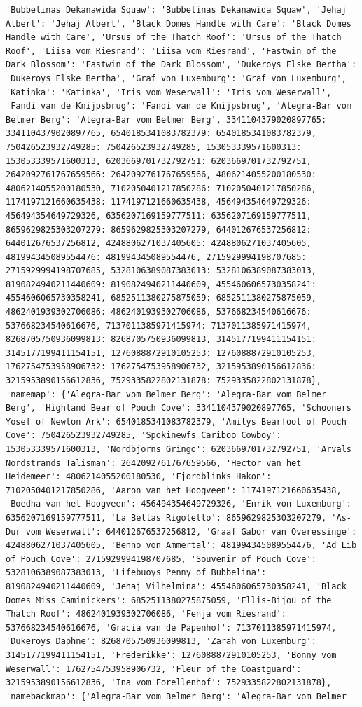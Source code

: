 \documentclass[
  letterpaper,
  DIV=11,
  numbers=noendperiod]{scrreprt}
\begin{document}
\begin{codelisting}
{\begin{verbatim}
'Bubbelinas Dekanawida Squaw': 'Bubbelinas Dekanawida Squaw', 'Jehaj Albert': 'Jehaj Albert', 'Black Domes Handle with Care': 'Black Domes Handle with Care', 'Ursus of the Thatch Roof': 'Ursus of the Thatch Roof', 'Liisa vom Riesrand': 'Liisa vom Riesrand', 'Fastwin of the Dark Blossom': 'Fastwin of the Dark Blossom', 'Dukeroys Elske Bertha': 'Dukeroys Elske Bertha', 'Graf von Luxemburg': 'Graf von Luxemburg', 'Katinka': 'Katinka', 'Iris vom Weserwall': 'Iris vom Weserwall', 'Fandi van de Knijpsbrug': 'Fandi van de Knijpsbrug', 'Alegra-Bar vom Belmer Berg': 'Alegra-Bar vom Belmer Berg', 3341104379020897765: 3341104379020897765, 6540185341083782379: 6540185341083782379, 750426523932749285: 750426523932749285, 153053339571600313: 153053339571600313, 6203669701732792751: 6203669701732792751, 2642092761767659566: 2642092761767659566, 4806214055200180530: 4806214055200180530, 7102050401217850286: 7102050401217850286, 1174197121660635438: 1174197121660635438, 456494354649729326: 456494354649729326, 6356207169159777511: 6356207169159777511, 8659629825303207279: 8659629825303207279, 644012676537256812: 644012676537256812, 4248806271037405605: 4248806271037405605, 481994345089554476: 481994345089554476, 2715929994198707685: 2715929994198707685, 5328106389087383013: 5328106389087383013, 8190824940211440609: 8190824940211440609, 4554606065730358241: 4554606065730358241, 6852511380275875059: 6852511380275875059, 4862401939302706086: 4862401939302706086, 537668234540616676: 537668234540616676, 7137011385971415974: 7137011385971415974, 8268705750936099813: 8268705750936099813, 3145177199411154151: 3145177199411154151, 1276088872910105253: 1276088872910105253, 1762754753958906732: 1762754753958906732, 3215953890156612836: 3215953890156612836, 7529335822802131878: 7529335822802131878}, 'namemap': {'Alegra-Bar vom Belmer Berg': 'Alegra-Bar vom Belmer Berg', 'Highland Bear of Pouch Cove': 3341104379020897765, 'Schooners Yosef of Newton Ark': 6540185341083782379, 'Amitys Bearfoot of Pouch Cove': 750426523932749285, 'Spokinewfs Cariboo Cowboy': 153053339571600313, 'Nordbjorns Gringo': 6203669701732792751, 'Arvals Nordstrands Talisman': 2642092761767659566, 'Hector van het Heidemeer': 4806214055200180530, 'Fjordblinks Hakon': 7102050401217850286, 'Aaron van het Hoogveen': 1174197121660635438, 'Boedha van het Hoogveen': 456494354649729326, 'Enrik von Luxemburg': 6356207169159777511, 'La Bellas Rigoletto': 8659629825303207279, 'As-Dur vom Weserwall': 644012676537256812, 'Graaf Gabor van Overessinge': 4248806271037405605, 'Benno von Ammertal': 481994345089554476, 'Ad Lib of Pouch Cove': 2715929994198707685, 'Souvenir of Pouch Cove': 5328106389087383013, 'Lifebuoys Penny of Bubbelina': 8190824940211440609, 'Jehaj Vilhelmina': 4554606065730358241, 'Black Domes Miss Caminickers': 6852511380275875059, 'Ellis-Bijou of the Thatch Roof': 4862401939302706086, 'Fenja vom Riesrand': 537668234540616676, 'Gracia van de Papenhof': 7137011385971415974, 'Dukeroys Daphne': 8268705750936099813, 'Zarah von Luxemburg': 3145177199411154151, 'Frederikke': 1276088872910105253, 'Bonny vom Weserwall': 1762754753958906732, 'Fleur of the Coastguard': 3215953890156612836, 'Ina vom Forellenhof': 7529335822802131878}, 'namebackmap': {'Alegra-Bar vom Belmer Berg': 'Alegra-Bar vom Belmer 
\end{verbatim}}
\end{codelisting}
\end{document}
